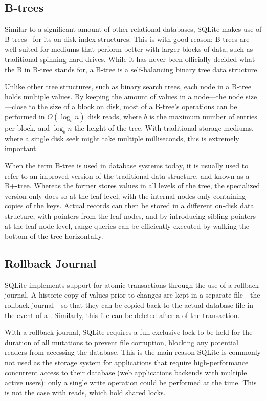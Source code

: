 \subsection{B-trees}\label{sec:btree}
Similar to a significant amount of other relational databases, SQLite makes use
of B-trees~\cite{btree} for its on-disk index structures. This is with good
reason: B-trees are well suited for mediums that perform better with larger
blocks of data, such as traditional spinning hard drives. While it has never
been officially decided what the B in B-tree stands for, a B-tree is a
self-balancing binary tree data structure.

Unlike other tree structures, such as binary search trees, each node in a B-tree
holds multiple values. By keeping the amount of values in a node---the node
size---close to the size of a block on disk, most of a B-tree's operations can
be performed in $ O(\log_b n) $ disk reads, where $ b $ is the maximum number of
entries per block, and $ \log_b n $ the height of the tree. With traditional
storage mediums, where a single disk seek might take multiple milliseconds, this
is extremely important.


When the term B-tree is used in database systems today, it is usually used to
refer to an improved version of the traditional data structure, and known as a
B+-tree. Whereas the former stores values in all levels of the tree, the
specialized version only does so at the leaf level, with the internal nodes only
containing copies of the keys. Actual records can then be stored in a different
on-disk data structure, with pointers from the leaf nodes, and by introducing
sibling pointers at the leaf node level, range queries can be efficiently
executed by walking the bottom of the tree horizontally.

\subsection{Rollback Journal}\label{sec:sqlite-locks}
SQLite implements support for atomic transactions through the use of a rollback
journal. A historic copy of values prior to changes are kept in a separate
file---the rollback journal---so that they can be copied back to the actual
database file in the event of a . Similarly, this file can be
deleted after a  of the transaction.

With a rollback journal, SQLite requires a full exclusive lock to be held for
the duration of all mutations to prevent file corruption, blocking any potential
readers from accessing the database. This is the main reason SQLite is commonly
not used as the storage system for applications that require high-performance
concurrent access to their database (\eg web applications backends with multiple
active users): only a single write operation could be performed at the time.
This is not the case with reads, which hold shared locks.

